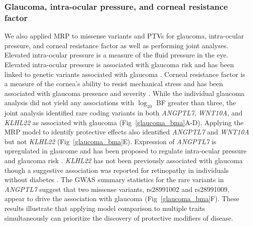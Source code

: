 \subsubsection*{Glaucoma, intra-ocular pressure, and corneal resistance factor}
We also applied MRP to missense variants and PTVs for glaucoma, intra-ocular pressure, and corneal resistance factor as well as performing joint analyses. Elevated intra-ocular pressure is a measure of the fluid pressure in the eye. Elevated intra-ocular pressure is associated with glaucoma risk and has been linked to genetic variants associated with glaucoma \cite{doi:10.1001/jama.2014.3192}. Corneal resistance factor is a measure of the cornea's ability to resist mechanical stress and has been associated with glaucoma presence and severity \cite{CXO:CXO414, MANSOURI2012419, GriseDulac:2012bo}. While the individual glaucoma analysis did not yield any associations with $\log_{10}$ BF greater than three, the joint analysis identified rare coding variants in both \textit{ANGPTL7}, \textit{WNT10A}, and \textit{KLHL22} as associated with glaucoma (Fig~\ref{glaucoma_bma}A-D). Applying the MRP model to identify protective effects also identified \textit{ANGPTL7} and \textit{WNT10A} but not \textit{KLHL22} (Fig~\ref{glaucoma_bma}E). Expression of \textit{ANGPTL7} is upregulated in glaucome and has been proposed to regulate intra-ocular pressure and glaucoma risk \cite{Comes:2011ex, Kuchtey:2008ek}. \textit{KLHL22} has not been previously associated with glaucoma though a suggestive association was reported for retinopathy in individuals without diabetes \cite{10.1371/journal.pone.0054232}. The GWAS summary statistics for the rare variants in \textit{ANGPTL7} suggest that two missense variants, rs28991002 and rs28991009, appear to drive the association with glaucoma (Fig~\ref{glaucoma_bma}F). These results illustrate that applying model comparison to multiple traits simultaneously can prioritize the discovery of protective modifiers of disease. 


